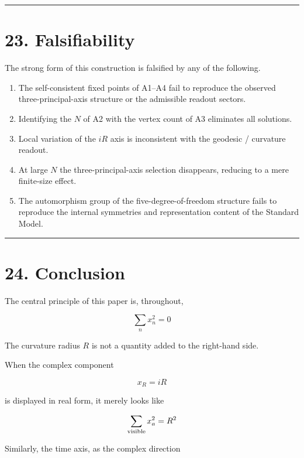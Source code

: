 \documentclass[
  a4paper,
]{article}
\providecommand{\tightlist}{%
  \setlength{\itemsep}{0pt}\setlength{\parskip}{0pt}}
\begin{document}
\begin{center}\rule{0.5\linewidth}{0.5pt}\end{center}

\section{23. Falsifiability}\label{falsifiability}

The strong form of this construction is falsified by any of the
following.

\begin{enumerate}
\def\labelenumi{\arabic{enumi}.}
\tightlist
\item
  The self-consistent fixed points of A1--A4 fail to reproduce the
  observed three-principal-axis structure or the admissible readout
  sectors.
\item
  Identifying the \(N\) of A2 with the vertex count of A3 eliminates all
  solutions.
\item
  Local variation of the \(iR\) axis is inconsistent with the geodesic /
  curvature readout.
\item
  At large \(N\) the three-principal-axis selection disappears, reducing
  to a mere finite-size effect.
\item
  The automorphism group of the five-degree-of-freedom structure fails
  to reproduce the internal symmetries and representation content of the
  Standard Model.
\end{enumerate}

\begin{center}\rule{0.5\linewidth}{0.5pt}\end{center}

\section{24. Conclusion}\label{conclusion}

The central principle of this paper is, throughout,

\[
\boxed{
\sum_nx_n^2=0
}
\]

The curvature radius \(R\) is not a quantity added to the right-hand
side.

When the complex component

\[
\boxed{
x_R=iR
}
\]

is displayed in real form, it merely looks like

\[
\sum_{\rm visible}x_a^2=R^2
\]

Similarly, the time axis, as the complex direction
\end{document}

